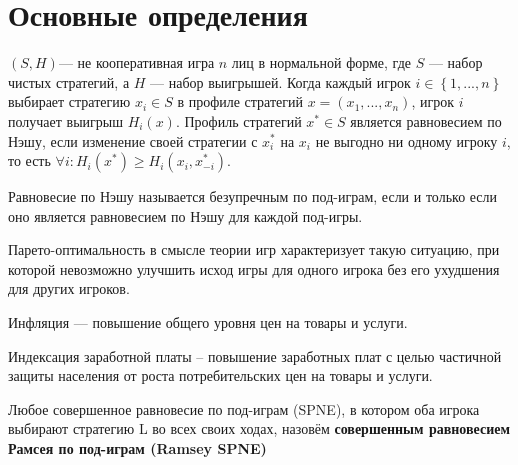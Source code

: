 \section{Основные определения}

\begin{definition}	$(S,H)$— не кооперативная игра $n$ лиц в нормальной форме, где $S$ — набор чистых стратегий, а $H$ — набор выигрышей. Когда каждый игрок $i \in \left\{1,...,n\right\}$  выбирает стратегию $x_i \in S$  в профиле стратегий $x=(x_1,...,x_n)$, игрок $i$  получает выигрыш $H_i(x)$. Профиль стратегий $x^* \in S$   является равновесием по Нэшу, если изменение своей стратегии с $x_i^*$  на $x_i$  не выгодно ни одному игроку $i$, то есть $\forall i : H_i(x^*) \ge H_i(x_i, x_{-i}^*)$.
\end{definition}
	
\begin{definition}
Равновесие по Нэшу называется безупречным по под-играм, если и только если оно является равновесием по Нэшу для каждой под-игры.
\end{definition}

\begin{definition}
Парето-оптимальность в смысле теории игр характеризует такую ситуацию, при которой невозможно улучшить исход игры для одного игрока без его ухудшения для других игроков.
\end{definition}

\begin{definition}
	Инфляция  — повышение общего уровня цен на товары и услуги.
\end{definition}

\begin{definition}
	Индексация заработной платы – повышение заработных плат с целью частичной защиты населения от роста потребительских цен на товары и услуги.
\end{definition}

\begin{definition}
	Любое совершенное равновесие по под-играм (SPNE), в котором оба игрока выбирают стратегию L во всех своих ходах, назовём \textbf{совершенным равновесием Рамсея по под-играм (Ramsey SPNE)}
\end{definition}
